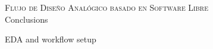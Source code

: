 \documentclass[ps,clariphy]{prosper}
\begin{document}
\begin{slide}{ \textsc{{\tiny Flujo de Dise\~no Anal\'ogico basado en Software Libre}}\\ Conclusions }
  \vspace{-0.5cm}
\tiny{ EDA and workflow setup
  \begin{figure}[ht]
      \centering
    \end{figure}
}
\end{slide}








\end{document}
